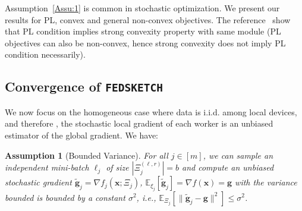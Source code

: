 \documentclass[11pt]{article}
\newtheorem{assumption}{Assumption}
\begin{document}
Assumption~\ref{Assu:1} is common in stochastic optimization. 
We present our results for PL, convex and general non-convex objectives. The reference~\citep{karimi2016linear} show that PL condition implies strong convexity property with same module (PL objectives can also be non-convex, hence strong convexity does not imply PL condition necessarily).

\vspace{-0.05in}
\subsection{Convergence of  \texttt{FEDSKETCH} } 
\vspace{-0.05in}
We now focus on the homogeneous case where data is i.i.d. among local devices, and therefore 
, the stochastic local gradient of each worker is an unbiased estimator of the global gradient.
We have:
\begin{assumption}[Bounded Variance]\label{Assu:1.5}
For all $j\in [m]$, we can sample an independent mini-batch $\ell_j$   of size $|\Xi_j^{(\ell,r)}| = b$ and compute an unbiased stochastic gradient  $\tilde{\mathbf{g}}_j = \nabla f_j(\boldsymbol{x}; \Xi_j)$, $\mathbb{E}_{\xi_j}[\tilde{\mathbf{g}}_j] = \nabla f(\boldsymbol{x})=\mathbf{g}$ with  the variance bounded is bounded by a constant $\sigma^2$, i.e., $
\mathbb{E}_{\Xi_j}\left[\|\tilde{\mathbf{g}}_j-\mathbf{g}\|^2\right]\leq \sigma^2$.
\end{assumption}
\end{document}
